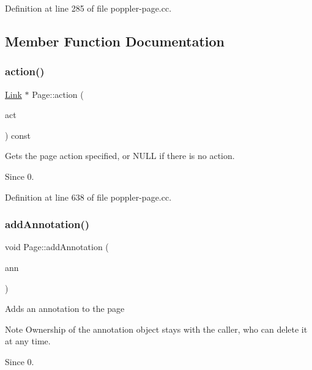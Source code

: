 Definition at line 285 of file poppler-\/page.\+cc.



\subsection{Member Function Documentation}
\mbox{\label{class_poppler_1_1_page_aae0237db3c5b8f7276f36b852af46f27}} 
\subsubsection{\texorpdfstring{action()}{action()}}
{\footnotesize\ttfamily \hyperlink{class_poppler_1_1_link}{Link} $\ast$ Page\+::action (\begin{DoxyParamCaption}\item[{\hyperlink{class_poppler_1_1_page_ac77a0b29e76e6ddcb6fb177ef3e3396f}{Page\+Action}}]{act }\end{DoxyParamCaption}) const}

Gets the page action specified, or N\+U\+LL if there is no action.

\begin{DoxySince}{Since}
0. 
\end{DoxySince}


Definition at line 638 of file poppler-\/page.\+cc.

\mbox{\label{class_poppler_1_1_page_a1235aa9d06e6f66c38f9bab4ac6a5bef}} 
\subsubsection{\texorpdfstring{add\+Annotation()}{addAnnotation()}}
{\footnotesize\ttfamily void Page\+::add\+Annotation (\begin{DoxyParamCaption}\item[{const \hyperlink{class_poppler_1_1_annotation}{Annotation} $\ast$}]{ann }\end{DoxyParamCaption})}

Adds an annotation to the page

\begin{DoxyNote}{Note}
Ownership of the annotation object stays with the caller, who can delete it at any time. 
\end{DoxyNote}
\begin{DoxySince}{Since}
0. 
\end{DoxySince}


